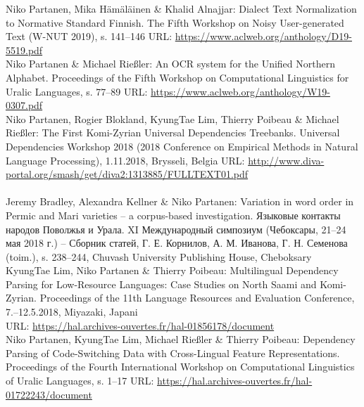 \documentclass[11pt, a4paper]{article}
\newcommand{\years}[1]{\marginnote{\scriptsize #1}} %
\begin{document}
\years{2019} Niko Partanen, Mika Hämäläinen \& Khalid Alnajjar: Dialect Text Normalization to Normative Standard Finnish. The Fifth Workshop on Noisy User-generated Text (W-NUT 2019), s. 141--146
URL: \url{https://www.aclweb.org/anthology/D19-5519.pdf}\\

\years{2019} Niko Partanen \& Michael Rießler: An OCR system for the Unified Northern Alphabet. Proceedings of the Fifth Workshop on Computational Linguistics for Uralic Languages, s. 77--89 URL: \url{https://www.aclweb.org/anthology/W19-0307.pdf}\\


\years{2018} Niko Partanen, Rogier Blokland, KyungTae Lim, Thierry Poibeau \& Michael Rießler: The First Komi-Zyrian Universal Dependencies Treebanks. Universal Dependencies Workshop 2018 (2018 Conference on Empirical Methods in Natural Language Processing), 1.11.2018, Brysseli, Belgia
URL: \url{http://www.diva-portal.org/smash/get/diva2:1313885/FULLTEXT01.pdf}\\
\\

\years{2018} Jeremy Bradley, Alexandra Kellner \& Niko Partanen: Variation in word order in Permic and Mari varieties – a corpus-based investigation. Языковые контакты народов Поволжья и Урала. XI Международный симпозиум (Чебоксары, 21–24 мая 2018 г.) – Сборник статей, Г. Е. Корнилов, А. М. Иванова, Г. Н. Семенова (toim.), s. 238–244, Chuvash University Publishing House, Cheboksary\\

\years{2018} KyungTae Lim, Niko Partanen \& Thierry Poibeau: Multilingual Dependency Parsing for Low-Resource Languages: Case Studies on North Saami and Komi-Zyrian. Proceedings of the 11th Language Resources and Evaluation Conference, 7.--12.5.2018, Miyazaki, Japani
\\URL: \url{https://hal.archives-ouvertes.fr/hal-01856178/document}\\

\years{2018} Niko Partanen, KyungTae Lim, Michael Rießler \& Thierry Poibeau: Dependency Parsing of Code-Switching Data with Cross-Lingual Feature Representations. Proceedings of the Fourth International Workshop on Computational Linguistics of Uralic Languages, s. 1--17
URL: \url{https://hal.archives-ouvertes.fr/hal-01722243/document}\\
\end{document}
